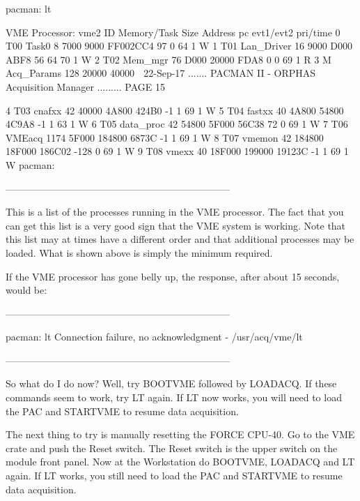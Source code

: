    pacman: lt
 
   VME Processor: vme2
    ID          Memory/Task    Size       Address      pc    evt1/evt2  pri/time
     0  T00             Task0    8    7000    9000  FF002CC4   97    0   64    1 W
     1  T01        Lan_Driver   16    9000    D000      ABF8   56   64   70    1 W
     2  T02           Mem_mgr   76    D000   20000      FDA8    0    0   69    1 R
     3  M          Acq_Params  128   20000   40000
    
   22-Sep-17 ....... PACMAN II - ORPHAS Acquisition Manager ......... PAGE  15
 
     4  T03            cnafxx   42   40000   4A800     424B0   -1    1   69    1 W
     5  T04            fastxx   40   4A800   54800     4C9A8   -1    1   63    1 W
     6  T05         data_proc   42   54800   5F000     56C38   72    0   69    1 W
     7  T06            VMEacq 1174   5F000  184800     6873C   -1    1   69    1 W
     8  T07            vmemon   42  184800  18F000    186C02 -128    0   69    1 W
     9  T08             vmexx   40  18F000  199000    19123C   -1    1   69    1 W
   pacman:
 
     ---------------------------------------------------------------------
 
   This is a list of the processes running in the  VME  processor.   The  fact
   that  you  can  get  this  list  is a very good sign that the VME system is
   working.  Note that this list may at times have a different order  and that
   additional  processes  may  be  loaded.   What is shown above is simply the
   minimum required.
 
   If the VME processor has gone  belly  up,  the  response,  after  about  15
   seconds, would be:
 
     ---------------------------------------------------------------------
 
   pacman: lt
   Connection failure, no acknowledgment - /usr/acq/vme/lt
 
     ---------------------------------------------------------------------
 
   So  what  do  I  do  now?  Well, try BOOTVME followed by LOADACQ.  If these
   commands seem to work, try LT again.  If LT now  works,  you  will  need to
   load the PAC and STARTVME to resume data acquisition.
 
   The  next  thing  to try is manually resetting the FORCE CPU-40.  Go to the
   VME crate and push the Reset switch. The Reset switch is the  upper  switch
   on  the module front panel.  Now at the Workstation do BOOTVME, LOADACQ and
   LT again.  If LT works, you still need to  load  the  PAC  and  STARTVME to
   resume data acquisition.
 
